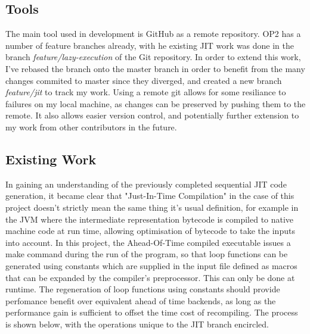 \documentclass[11pt]{article}
\begin{document}
\subsection*{Tools}
The main tool used in development is GitHub as a remote repository. OP2 has a number of feature branches already, with he existing JIT work was done in the branch \textit{feature/lazy-execution} of the Git repository. In order to extend this work, I've rebased the branch onto the master branch in order to benefit from the many changes commited to master since they diverged, and created a new branch \textit{feature/jit} to track my work. Using a remote git allows for some resiliance to failures on my local machine, as changes can be preserved by pushing them to the remote. It also allows easier version control, and potentially further extension to my work from other contributors in the future. 
\subsection*{Existing Work}
 In gaining an understanding of the previously completed sequential JIT code generation, it became clear that "Just-In-Time Compilation" in the case of this project doesn't strictly mean the same thing it's usual definition, for example in the JVM where the intermediate representation bytecode is compiled to native machine code at run time, allowing optimisation of bytecode to take the inputs into account. In this project, the Ahead-Of-Time compiled executable issues a make command during the run of the program, so that loop functions can be generated using constants which are supplied in the input file defined as macros that can be expanded by the compiler's preprocessor. This can only be done at runtime. The regeneration of loop functions using constants should provide perfomance benefit over equivalent ahead of time backends, as long as the performance gain is sufficient to offset the time cost of recompiling. The process is shown below, with the operations unique to the JIT branch encircled.
\end{document}
